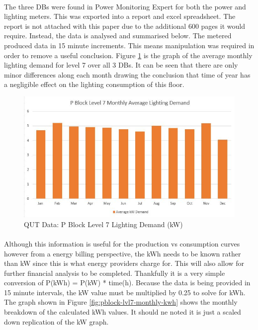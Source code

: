 \paragraph{}
The three DBs were found in Power Monitoring Expert for both the power and lighting meters. This was exported into a report and excel spreadsheet. The report is not attached with this paper due to the additional 600 pages it would require. Instead, the data is analysed and summarised below. The metered produced data in 15 minute increments. This means manipulation was required in order to remove a useful conclusion. Figure \ref{fig:pblock-lvl7-monthly-kw} is the graph of the average monthly lighting demand for level 7 over all 3 DBs. It can be seen that there are only minor differences along each month drawing the conclusion that time of year has a negligible effect on the lighting consumption of this floor.  

\begin{figure}[H]
	\hfill\includegraphics[width = 150mm]{images/metering/pme/pblock-lvl7-monthly-kw}\hspace*{\fill}
	\caption{QUT Data: P Block Level 7 Lighting Demand (kW)} 
	\label{fig:pblock-lvl7-monthly-kw}
\end{figure}  

\paragraph{}
Although this information is useful for the production vs consumption curves however from a energy billing perspective, the kWh needs to be known rather than kW since this is what energy providers charge for. This will also allow for further financial analysis to be completed. Thankfully it is a very simple conversion of P(kWh) = P(kW) * time(h). Because the data is being provided in 15 minute intervals, the kW value must be multiplied by 0.25 to solve for kWh. The graph shown in Figure \ref{fig:pblock-lvl7-monthly-kwh} shows the monthly breakdown of the calculated kWh values. It should ne noted it is just a scaled down replication of the kW graph.    

